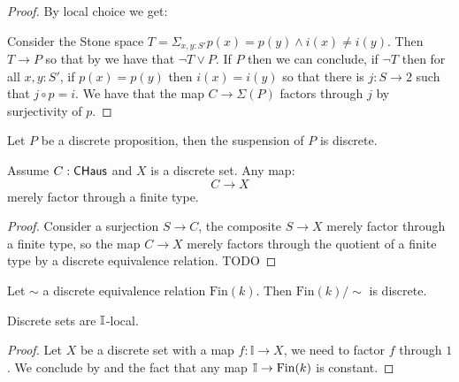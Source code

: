 \begin{proof}
By local choice we get:
\begin{center}
\end{center}
Consider the Stone space $T = \Sigma_{x,y:S'}p(x)=p(y)\land i(x)\not=i(y)$. Then $T\to P$ so that by  we have that $\neg T\lor P$. If $P$ then we can conclude, if $\neg T$ then for all $x,y:S'$, if $p(x)=p(y)$ then $i(x)=i(y)$ so that there is $j:S\to 2$ such that $j\circ p=i$. We have that the map $C\to \Sigma(P)$ factors through $j$ by surjectivity of $p$. 
\end{proof}

\begin{corollary}
Let $P$ be a discrete proposition, then the suspension of $P$ is discrete.
\end{corollary}

\begin{lemma}\label{compact-hausdorff-discrete-quotient-finite-factorisation}
Assume $C:\mathsf{CHaus}$ and $X$ is a discrete set. Any map:
\[C\to X\]
merely factor through a finite type. 
\end{lemma}

\begin{proof}
Consider a surjection $S\to C$, the composite $S\to X$ merely factor through a finite type, so the map $C\to X$ merely factors through the quotient of a finite type by a discrete equivalence relation. TODO 
\end{proof}

\begin{corollary}
Let $\sim$ a discrete equivalence relation $\mathrm{Fin}(k)$. Then $\mathrm{Fin}(k)/\sim$ is discrete.
\end{corollary}

\begin{proposition}
Discrete sets are $\mathbb{I}$-local.
\end{proposition}

\begin{proof}
Let $X$ be a discrete set with a map $f:\mathbb{I}\to X$, we need to factor $f$ through $1$. We conclude by  and the fact that any map $\mathbb{I}\to \mathrm{Fin}(k)$ is constant.
\end{proof}

